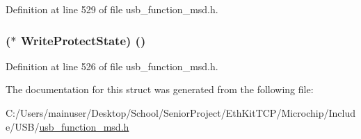 Definition at line 529 of file usb\+\_\+function\+\_\+msd.\+h.

\hypertarget{struct_l_u_n___f_u_n_c_t_i_o_n_s_a49924a3656c6cafef4e0e9ccd398b7c1}{}
\subsubsection[{Write\+Protect\+State}]{($\ast$ Write\+Protect\+State) ()}\label{struct_l_u_n___f_u_n_c_t_i_o_n_s_a49924a3656c6cafef4e0e9ccd398b7c1}


Definition at line 526 of file usb\+\_\+function\+\_\+msd.\+h.



The documentation for this struct was generated from the following file\+:\begin{DoxyCompactItemize}
\item 
C\+:/\+Users/mainuser/\+Desktop/\+School/\+Senior\+Project/\+Eth\+Kit\+T\+C\+P/\+Microchip/\+Include/\+U\+S\+B/\hyperlink{usb__function__msd_8h}{usb\+\_\+function\+\_\+msd.\+h}\end{DoxyCompactItemize}
